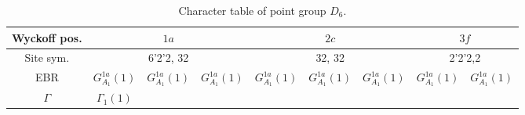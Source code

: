 \documentclass[a4paper,12pt]{report}
\begin{document}
%
%


\begin{table}[H]
\caption{Character table of point group $D_6$.}
\centering
\begin{tabular}{|c|c|c|c|c|c|c|c|c|}
\hline
Wyckoff pos. & \multicolumn{3}{c|}{$1a$} & \multicolumn{3}{c|}{$2c$} & \multicolumn{2}{c|}{$3f$} \\
\hline
Site sym. & \multicolumn{3}{c|}{6'2'2, 32} & \multicolumn{3}{c|}{32, 32} & \multicolumn{2}{c|}{2'2'2,2} \\
\hline
EBR      & $G_{A_1}^{1a}(1)$ & $G_{A_1}^{1a}(1)$ & $G_{A_1}^{1a}(1)$ & $G_{A_1}^{1a}(1)$ & $G_{A_1}^{1a}(1)$ & $G_{A_1}^{1a}(1)$   & $G_{A_1}^{1a}(1)$ & $G_{A_1}^{1a}(1)$ \\
\hline
$\Gamma$ & $\Gamma_1(1)$ &       &      &       &       &      &       &       \\
\hline
\end{tabular}
\label{tab:matbg-irreps}
\end{table}



%


\end{document}

